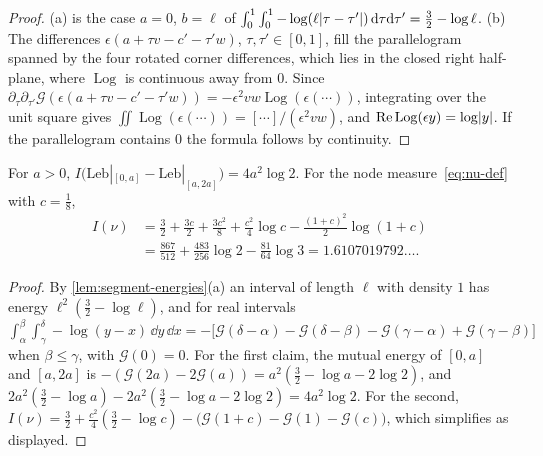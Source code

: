 \begin{proof}
(a) is the case $a=0$, $b=\ell$ of $\int_0^1\int_0^1-\log(\ell\lvert \tau-\tau'\rvert)\,\mathrm{d}\tau\mathrm{d}\tau'=\frac32-\log\ell$.
(b) The differences $\epsilon(a+\tau v-c'-\tau'w)$, $\tau,\tau'\in[0,1]$, fill the parallelogram
spanned by the four rotated corner differences, which lies in the closed right half-plane, where
$\operatorname{Log}$ is continuous away from $0$. Since
$\partial_\tau\partial_{\tau'}\mathcal G(\epsilon(a+\tau v-c'-\tau'w))=-\epsilon^2vw\operatorname{Log}(\epsilon(\cdots))$,
integrating over the unit square gives
$\iint\operatorname{Log}(\epsilon(\cdots))=[\cdots]/(\epsilon^2vw)$, and
$\operatorname{Re}\operatorname{Log}(\epsilon y)=\log\lvert y\rvert$. If the parallelogram contains $0$ the
formula follows by continuity.
\end{proof}

\begin{lemma}\label{lem:Inu}
For $a>0$, $I\bigl(\mathrm{Leb}|_{[0,a]}-\mathrm{Leb}|_{[a,2a]}\bigr)=4a^2\log2$. For the node
measure~\eqref{eq:nu-def} with $c=\frac18$,
\begin{align*}
  I(\nu)&=\frac32+\frac{3c}2+\frac{3c^2}8+\frac{c^2}4\log c-\frac{(1+c)^2}2\log(1+c)\\
  &=\frac{867}{512}+\frac{483}{256}\log2-\frac{81}{64}\log3=1.6107019792\ldots .
\end{align*}
\end{lemma}

\begin{proof}
By \cref{lem:segment-energies}(a) an interval of length $\ell$ with density $1$ has energy
$\ell^2(\frac32-\log\ell)$, and for real intervals
$\int_\alpha^\beta\int_\gamma^\delta-\log(y-x)\,\dd y\,\dd x=-\bigl[\mathcal G(\delta-\alpha)-\mathcal G(\delta-\beta)
-\mathcal G(\gamma-\alpha)+\mathcal G(\gamma-\beta)\bigr]$ when $\beta\le\gamma$, with $\mathcal G(0)=0$. For the first claim,
the mutual energy of $[0,a]$ and $[a,2a]$ is $-(\mathcal G(2a)-2\mathcal G(a))=a^2(\frac32-\log a-2\log2)$, and
$2a^2(\frac32-\log a)-2a^2(\frac32-\log a-2\log2)=4a^2\log2$. For the second,
$I(\nu)=\frac32+\frac{c^2}4(\frac32-\log c)-\bigl(\mathcal G(1+c)-\mathcal G(1)-\mathcal G(c)\bigr)$, which simplifies as
displayed.
\end{proof}

